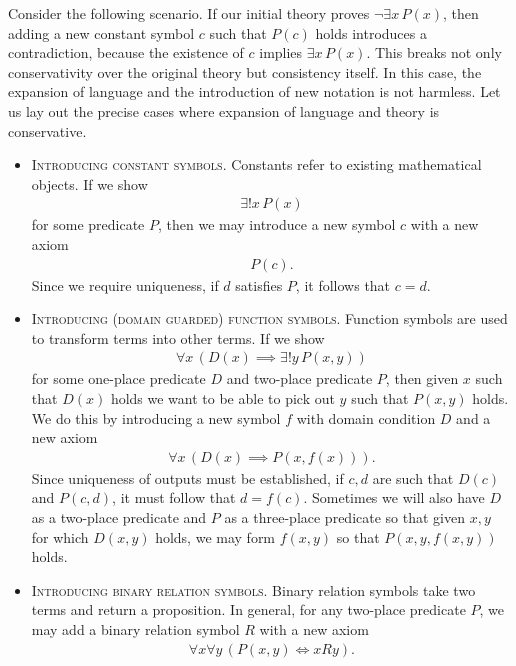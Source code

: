 Consider the following scenario.
If our initial theory proves $\neg\exists x\, P(x)$, then adding a new constant symbol $c$ such that $P(c)$ holds introduces a contradiction, because the existence of $c$ implies $\exists x\, P(x)$.
This breaks not only conservativity over the original theory but consistency itself. 
In this case, the expansion of language and the introduction of new notation is not harmless. 
Let us lay out the precise cases where expansion of language and theory is conservative. 

\begin{itemize}[itemsep=-0.4ex]
	\item \textsc{Introducing constant symbols.} 
	Constants refer to existing mathematical objects.
	If we show 
	\begin{align*}
		\exists ! x\, P(x)
	\end{align*}
	for some predicate $P$, then we may introduce a new symbol $c$ with a new axiom 
	\begin{align}\label{ch1eqn_const_ax}
		P(c).
	\end{align}
	Since we require uniqueness, if $d$ satisfies $P$, it follows that $c = d$.
	\item\textsc{Introducing (domain guarded) function symbols.}
	Function symbols are used to transform terms into other terms.
	If we show 
	\begin{align*}
		\forall x\, (D(x)\implies \exists ! y\, P(x, y))
	\end{align*}
	for some one-place predicate $D$ and two-place predicate $P$, then given $x$ such that $D(x)$ holds we want to be able to pick out $y$ such that $P(x, y)$ holds. 
	We do this by introducing a new symbol $f$ with domain condition $D$ and a new axiom 
	\begin{align}\label{ch1eqn_fn_ax}
		\forall x\, (D(x)\implies P(x, f(x))).
	\end{align}
	Since uniqueness of outputs must be established, if $c, d$ are such that $D(c)$ and $P(c, d)$, it must follow that $d = f(c)$. 
	Sometimes we will also have $D$ as a two-place predicate and $P$ as a three-place predicate so that given $x, y$ for which $D(x, y)$ holds, we may form $f(x, y)$ so that $P(x, y, f(x, y))$ holds.
	\item\textsc{Introducing binary relation symbols.}
	Binary relation symbols take two terms and return a proposition. 
	In general, for any two-place predicate $P$, we may add a binary relation symbol $R$ with a new axiom 
	\begin{align}\label{ch1eqn_rel_ax}
		\forall x\forall y\, (P(x, y) \iff xRy).
	\end{align}
\end{itemize}

